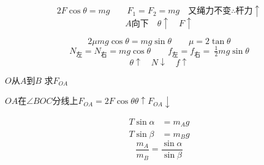 \begin{problem}
\begin{solution}
\[ 2F\cos\theta=mg\qquad F_1=F_2=mg\quad\text{又绳力不变}\therefore\text{杆力}\uparrow \] %
\[ A\text{向下}\quad\theta\uparrow\quad F\uparrow \]
\end{solution}
\end{problem}
\begin{problem}
\begin{solution}
\[ 2\mu mg\cos\theta=mg\sin\theta\qquad \mu=2\tan\theta \] %
\[ N_{\text{左}}=N_{\text{右}}=mg\cos\theta\qquad f_{\text{左}}=f_{\text{右}}=\ \tfrac12 mg\sin\theta \] %
\[ \theta\uparrow\quad N\downarrow\quad f\uparrow \]
\end{solution}
\end{problem}
\begin{problem}
$O$从$A$到$B$ 求$F_{OA}$ %
\begin{solution}
$OA$在$\angle BOC$分线上\qquad $F_{OA}=2F\cos\theta$\qquad $\theta\uparrow$\quad $F_{OA}\downarrow$
\end{solution}
\end{problem}
\begin{problem}
\begin{solution}
\begin{align*}
T\sin\alpha&=m_Ag\\
T\sin\beta&=m_Bg
\end{align*}
\[ \frac{m_A}{m_B}=\frac{\sin\alpha}{\sin\beta} \]
\end{solution}
\end{problem}
